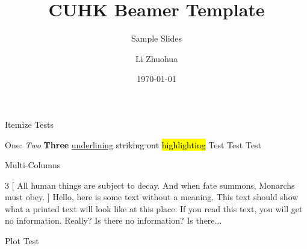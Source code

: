 

\title[Sample]{CUHK Beamer Template}
\subtitle{Sample Slides}
\author[Li Zhuohua]{Li Zhuohua}
\date{\today}



\frame[plain]{\maketitle}


\begin{frame}{Itemize Tests}
	\renewcommand{\outlineii}{enumerate}
	\begin{outline}
		\1 One: \textit{Two} \textbf{Three}
			\2 
			\2 \ul{underlining}
			\2 \st{striking out}
			\2 \hl{highlighting}
			\2 
		\1 Test Test Test
	\end{outline}
\end{frame}

\begin{frame}{Multi-Columns}
	\begin{multicols}{3}
    [
    All human things are subject to decay. And when fate summons, Monarchs must obey.
    ]
    Hello, here is some text without a meaning.  This text should show what 
    a printed text will look like at this place.
    If you read this text, you will get no information.  Really?  Is there 
    no information?  Is there...
    \end{multicols}
\end{frame}

\begin{frame}{Plot Test}
    \pgfplotsset{width=5.5cm,compat=1.9}
    \hskip 5pt
\end{frame}

